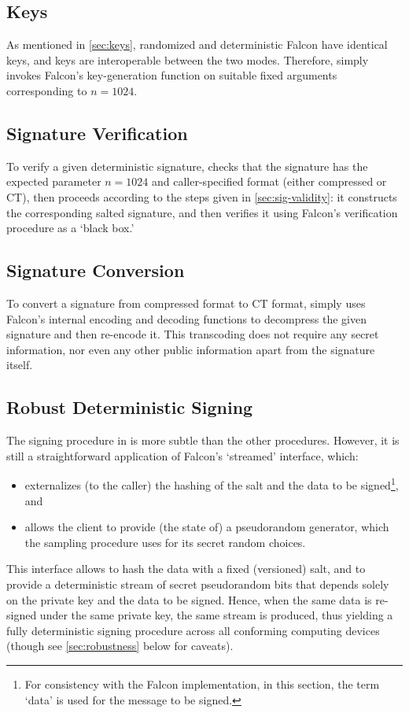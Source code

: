 \documentclass[11pt]{article}
\begin{document}
\subsection{Keys}
\label{sec:impl-keys}

As mentioned in \cref{sec:keys}, randomized and deterministic Falcon
have identical keys, and keys are interoperable between the two
modes. Therefore, \fd simply invokes Falcon's key-generation function
on suitable fixed arguments corresponding to $n=1024$.

\subsection{Signature Verification}
\label{sec:impl-verification}

To verify a given deterministic signature, \fd checks that the
signature has the expected parameter $n=1024$ and caller-specified
format (either compressed or CT), then proceeds according to the steps
given in \cref{sec:sig-validity}: it constructs the corresponding
salted signature, and then verifies it using Falcon's verification
procedure as a `black box.'

\subsection{Signature Conversion}
\label{sec:signature-conversion}

To convert a signature from compressed format to CT format, \fd simply
uses Falcon's internal encoding and decoding functions to decompress
the given signature and then re-encode it. This transcoding does not
require any secret information, nor even any other public information
apart from the signature itself.

\subsection{Robust Deterministic Signing}
\label{sec:robust-determ-sign}

The signing procedure in \fd is more subtle than the other
procedures. However, it is still a straightforward application of
Falcon's `streamed' interface, which:
\begin{itemize}[itemsep=0pt]
\item externalizes (to the caller) the hashing of the salt and the
  data to be signed\footnote{For consistency with the Falcon
    implementation, in this section, the term `data' is used for the
    message to be signed.}, and
\item allows the client to provide (the state of) a pseudorandom
  generator, which the sampling procedure uses for its secret random
  choices.
\end{itemize}
This interface allows \fd to hash the data with a fixed (versioned)
salt, and to provide a deterministic stream of secret pseudorandom
bits that depends solely on the private key and the data to be
signed. Hence, when the same data is re-signed under the same private
key, the same stream is produced, thus yielding a fully deterministic
signing procedure across all conforming computing devices (though see
\cref{sec:robustness} below for caveats).
\end{document}
